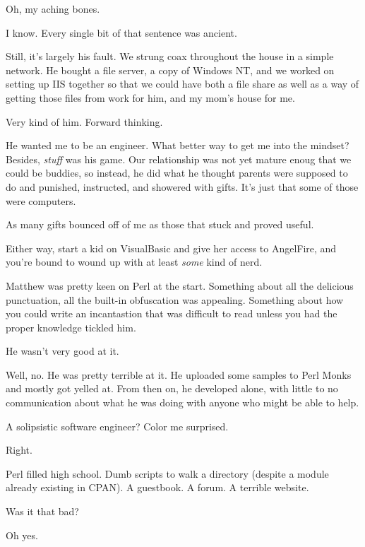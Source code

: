 \begin{paracol}{2}
\begin{leftcolumn}
\begin{ally}
Oh, my aching bones.
\end{ally}
I know. Every single bit of that sentence was ancient.

Still, it's largely his fault. We strung coax throughout the house in a simple network. He bought a file server, a copy of Windows NT, and we worked on setting up IIS together so that we could have both a file share as well as a way of getting those files from work for him, and my mom's house for me.

\begin{ally}
Very kind of him. Forward thinking.
\end{ally}
He wanted me to be an engineer. What better way to get me into the mindset? Besides, \emph{stuff} was his game. Our relationship was not yet mature enoug that we could be buddies, so instead, he did what he thought parents were supposed to do and punished, instructed, and showered with gifts. It's just that some of those were computers.

As many gifts bounced off of me as those that stuck and proved useful.

Either way, start a kid on VisualBasic and give her access to AngelFire, and you're bound to wound up with at least \emph{some} kind of nerd.
\newpage

\noindent Matthew was pretty keen on Perl at the start. Something about all the delicious punctuation, all the built-in obfuscation was appealing. Something about how you could write an incantastion that was difficult to read unless you had the proper knowledge tickled him.

\begin{ally}
He wasn't very good at it.
\end{ally}
Well, no. He was pretty terrible at it. He uploaded some samples to Perl Monks and mostly got yelled at. From then on, he developed alone, with little to no communication about what he was doing with anyone who might be able to help.

\begin{ally}
A solipsistic software engineer? Color me surprised.
\end{ally}
Right.

Perl filled high school. Dumb scripts to walk a directory (despite a module already existing in CPAN). A guestbook. A forum. A terrible website.

\begin{ally}
Was it that bad?
\end{ally}
Oh yes.


\end{leftcolumn}
\end{paracol}
